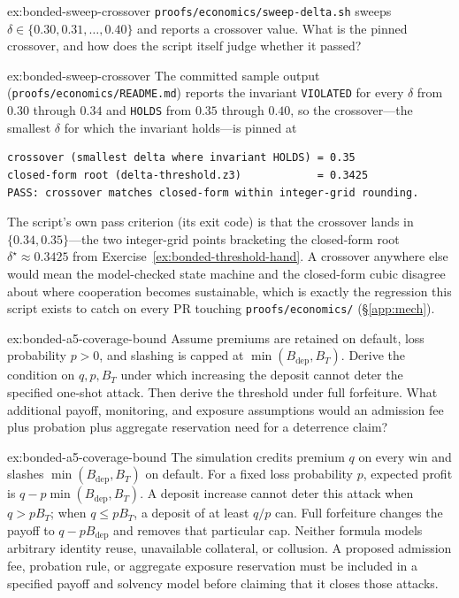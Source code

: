 \documentclass[11pt,a4paper]{article}
\theoremstyle{definition}
\theoremstyle{remark}
\begin{document}
\begin{pdexercise}[kind=Trace,rating=2]{ex:bonded-sweep-crossover}
\texttt{proofs/economics/sweep-delta.sh} sweeps $\delta \in \{0.30, 0.31, \ldots, 0.40\}$ and reports a crossover value. What is the pinned crossover, and how does the script itself judge whether it passed?
\end{pdexercise}
\begin{pdsolution}{ex:bonded-sweep-crossover}
The committed sample output (\texttt{proofs/economics/README.md}) reports the invariant \texttt{VIOLATED} for every $\delta$ from $0.30$ through $0.34$ and \texttt{HOLDS} from $0.35$ through $0.40$, so the crossover---the smallest $\delta$ for which the invariant holds---is pinned at
\begin{lstlisting}
crossover (smallest delta where invariant HOLDS) = 0.35
closed-form root (delta-threshold.z3)            = 0.3425
PASS: crossover matches closed-form within integer-grid rounding.
\end{lstlisting}
The script's own pass criterion (its exit code) is that the crossover lands in $\{0.34, 0.35\}$---the two integer-grid points bracketing the closed-form root $\delta^\star\approx0.3425$ from Exercise~\ref{ex:bonded-threshold-hand}. A crossover anywhere else would mean the model-checked state machine and the closed-form cubic disagree about where cooperation becomes sustainable, which is exactly the regression this script exists to catch on every PR touching \texttt{proofs/economics/} (\S\ref{app:mech}).
\end{pdsolution}

\begin{pdexercise}[kind=Trace,rating=2]{ex:bonded-a5-coverage-bound}
Assume premiums are retained on default, loss probability $p>0$, and
slashing is capped at $\min(B_{\mathrm{dep}},B_T)$. Derive the condition on
$q,p,B_T$ under which increasing the deposit cannot deter the specified
one-shot attack. Then derive the threshold under full forfeiture. What
additional payoff, monitoring, and exposure assumptions would an admission
fee plus probation plus aggregate reservation need for a deterrence claim?
\end{pdexercise}
\begin{pdsolution}{ex:bonded-a5-coverage-bound}
The simulation credits premium $q$ on every win and slashes
$\min(B_{\mathrm{dep}},B_T)$ on default. For a fixed loss probability $p$,
expected profit is $q-p\min(B_{\mathrm{dep}},B_T)$. A deposit increase
cannot deter this attack when $q>pB_T$; when $q\le pB_T$, a deposit of
at least $q/p$ can. Full forfeiture changes the payoff to
$q-pB_{\mathrm{dep}}$ and removes that particular cap. Neither formula
models arbitrary identity reuse, unavailable collateral, or collusion.
A proposed admission fee, probation rule, or aggregate exposure reservation
must be included in a specified payoff and solvency model before claiming
that it closes those attacks.
\end{pdsolution}
\end{document}
